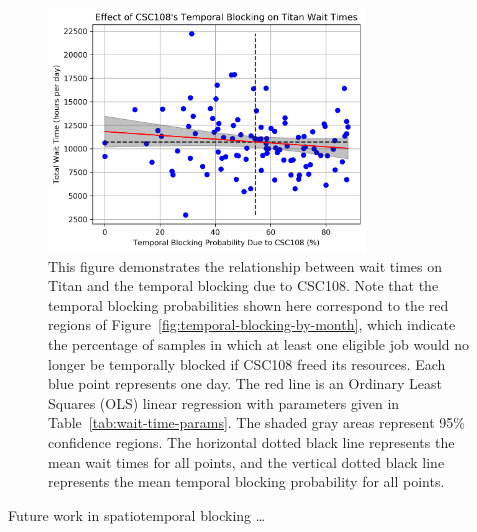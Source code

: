 \begin{figure}
  \includegraphics[width=0.75\textwidth]{images/linfit-wait-time-vs-csc108-temporal.png}
\caption{This figure demonstrates the relationship between wait times on Titan
and the temporal blocking due to CSC108. Note that the temporal blocking
probabilities shown here correspond to the red regions of
Figure~\ref{fig:temporal-blocking-by-month}, which indicate the percentage of
samples in which at least one eligible job would no longer be temporally
blocked  if CSC108 freed its resources. Each blue point represents one day. The
red line is an Ordinary Least Squares (OLS) linear regression with parameters
given in Table~\ref{tab:wait-time-params}. The shaded gray areas represent 95\%
confidence regions. The horizontal dotted black line represents the mean wait
times for all points, and the vertical dotted black line represents the mean
temporal blocking probability for all points.}
\label{fig:wait-time-spatial-csc108}
\end{figure}



Future work in spatiotemporal blocking \ldots

%
%
%
%

